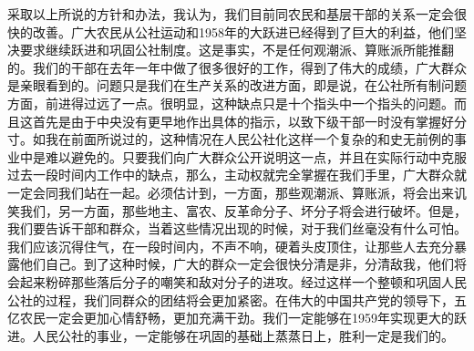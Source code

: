 采取以上所说的方针和办法，我认为，我们目前同农民和基层干部的关系一定会很快的改善。广大农民从公社运动和1958年的大跃进已经得到了巨大的利益，他们坚决要求继续跃进和巩固公社制度。这是事实，不是任何观潮派、算账派所能推翻的。我们的干部在去年一年中做了很多很好的工作，得到了伟大的成绩，广大群众是亲眼看到的。问题只是我们在生产关系的改进方面，即是说，在公社所有制问题方面，前进得过远了一点。很明显，这种缺点只是十个指头中一个指头的问题。而且这首先是由于中央没有更早地作出具体的指示，以致下级干部一时没有掌握好分寸。如我在前面所说过的，这种情况在人民公社化这样一个复杂的和史无前例的事业中是难以避免的。只要我们向广大群众公开说明这一点，并且在实际行动中克服过去一段时间内工作中的缺点，那么，主动权就完全掌握在我们手里，广大群众就一定会同我们站在一起。必须估计到，一方面，那些观潮派、算账派，将会出来讥笑我们，另一方面，那些地主、富农、反革命分子、坏分子将会进行破坏。但是，我们要告诉干部和群众，当着这些情况出现的时候，对于我们丝毫没有什么可怕。我们应该沉得住气，在一段时间内，不声不响，硬着头皮顶住，让那些人去充分暴露他们自己。到了这种时候，广大的群众一定会很快分清是非，分清敌我，他们将会起来粉碎那些落后分子的嘲笑和敌对分子的进攻。经过这样一个整顿和巩固人民公社的过程，我们同群众的团结将会更加紧密。在伟大的中国共产党的领导下，五亿农民一定会更加心情舒畅，更加充满干劲。我们一定能够在1959年实现更大的跃进。人民公社的事业，一定能够在巩固的基础上蒸蒸日上，胜利一定是我们的。



